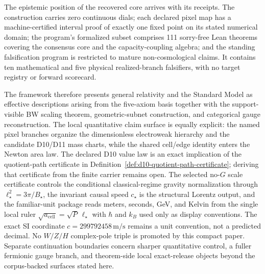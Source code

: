 \documentclass[11pt]{article}
\begin{document}
The epistemic position of the recovered core arrives with its receipts. The construction carries zero continuous dials; each declared pixel map has a machine-certified interval proof of exactly one fixed point on its stated numerical domain; the program's formalized subset comprises 111 sorry-free Lean theorems covering the consensus core and the capacity-coupling algebra; and the standing falsification program is restricted to mature non-cosmological claims. It contains ten mathematical and five physical realized-branch falsifiers, with no target registry or forward scorecard.

The framework therefore presents general relativity and the Standard Model as effective descriptions arising from the five-axiom basis together with the support-visible BW scaling theorem, geometric-subnet construction, and categorical gauge reconstruction. The local quantitative claim surface is equally explicit: the named pixel branches organize the dimensionless electroweak hierarchy and the candidate D10/D11 mass charts, while the shared cell/edge identity enters the Newton area law. The declared D10 value law is an exact implication of the quotient-path certificate in Definition~\ref{def:d10-quotient-path-certificate}; deriving that certificate from the finite carrier remains open. The selected no-\(G\) scale certificate controls the conditional classical-regime gravity normalization through \(\ell_\star^2=3\pi/B_\star\), the invariant causal speed \(c_\star\) is the structural Lorentz output, and the familiar-unit package reads meters, seconds, GeV, and Kelvin from the single local ruler \(\sqrt{a_{\mathrm{cell}}}=\sqrt{P}\,\ell_\star\) with \(\hbar\) and \(k_B\) used only as display conventions. The exact SI coordinate \(c=299792458\,\mathrm{m/s}\) remains a unit convention, not a predicted decimal. No \(W/Z/H\) complex-pole triple is promoted by this compact paper. Separate continuation boundaries concern sharper quantitative control, a fuller fermionic gauge branch, and theorem-side local exact-release objects beyond the corpus-backed surfaces stated here.

\appendix

\end{document}
